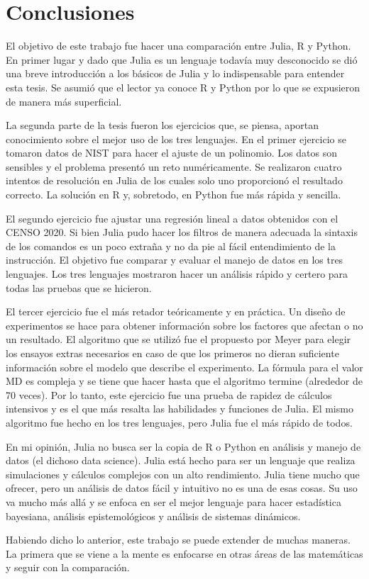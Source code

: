 \chapter{Conclusiones}

El objetivo de este trabajo fue hacer una comparación entre \textsf{Julia}, \textsf{R} y \textsf{Python}. En primer lugar y dado que \textsf{Julia} es un lenguaje todavía muy desconocido se dió una breve introducción a los básicos de \textsf{Julia} y lo indispensable para entender esta tesis. Se asumió que el lector ya conoce \textsf{R} y \textsf{Python} por lo que se expusieron de manera más superficial. 

La segunda parte de la tesis fueron los ejercicios que, se piensa, aportan conocimiento sobre el mejor uso de los tres lenguajes. En el primer ejercicio se tomaron datos de NIST para hacer el ajuste de un polinomio. Los datos son sensibles y el problema presentó un reto numéricamente. Se realizaron cuatro intentos de resolución en \textsf{Julia} de los cuales solo uno proporcionó el resultado correcto. La solución en \textsf{R} y, sobretodo, en \textsf{Python} fue más rápida y sencilla. 

El segundo ejercicio fue ajustar una regresión lineal a datos obtenidos con el CENSO 2020. Si bien \textsf{Julia} pudo hacer los filtros de manera adecuada la sintaxis de los comandos es un poco extraña y no da pie al fácil entendimiento de la instrucción. El objetivo fue comparar y evaluar el manejo de datos en los tres lenguajes. Los tres lenguajes mostraron hacer un análisis rápido y certero para todas las pruebas que se hicieron.

El tercer ejercicio fue el más retador teóricamente y en práctica. Un diseño de experimentos se hace para obtener información sobre los factores que afectan o no un resultado. El algoritmo que se utilizó fue el propuesto por Meyer para elegir los ensayos extras necesarios en caso de que los primeros no dieran suficiente información sobre el modelo que describe el experimento. La fórmula para el valor MD es compleja y se tiene que hacer hasta que el algoritmo termine (alrededor de 70 veces). Por lo tanto, este ejercicio fue una prueba de rapidez de cálculos intensivos y es el que más resalta las habilidades y funciones de \textsf{Julia}. El mismo algoritmo fue hecho en los tres lenguajes, pero \textsf{Julia} fue el más rápido de todos. 

En mi opinión, \textsf{Julia} no busca ser la copia de \textsf{R} o \textsf{Python} en análisis y manejo de datos (el dichoso data science). \textsf{Julia} está hecho para ser un lenguaje que realiza simulaciones y cálculos complejos con un alto rendimiento. \textsf{Julia} tiene mucho que ofrecer, pero un análisis de datos fácil y intuitivo no es una de esas cosas. Su uso va mucho más allá y se enfoca en ser el mejor lenguaje para hacer estadística bayesiana, análisis epistemológicos y análisis de sistemas dinámicos. 

Habiendo dicho lo anterior, este trabajo se puede extender de muchas maneras. La primera que se viene a la mente es enfocarse en otras áreas de las matemáticas y seguir con la comparación. 



